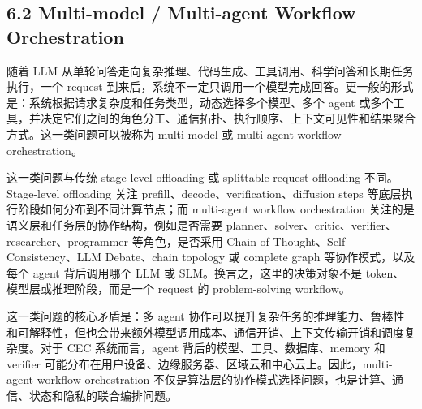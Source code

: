 \documentclass[a4paper,twocolumn,10pt]{ctexart}
\begin{document}
\subsection{6.2 Multi-model / Multi-agent Workflow Orchestration}

随着 LLM 从单轮问答走向复杂推理、代码生成、工具调用、科学问答和长期任务执行，一个 request 到来后，系统不一定只调用一个模型完成回答。更一般的形式是：系统根据请求复杂度和任务类型，动态选择多个模型、多个 agent 或多个工具，并决定它们之间的角色分工、通信拓扑、执行顺序、上下文可见性和结果聚合方式。这一类问题可以被称为 multi-model 或 multi-agent workflow orchestration。


这一类问题与传统 stage-level offloading 或 splittable-request offloading 不同。Stage-level offloading 关注 prefill、decode、verification、diffusion steps 等底层执行阶段如何分布到不同计算节点；而 multi-agent workflow orchestration 关注的是语义层和任务层的协作结构，例如是否需要 planner、solver、critic、verifier、researcher、programmer 等角色，是否采用 Chain-of-Thought、Self-Consistency、LLM Debate、chain topology 或 complete graph 等协作模式，以及每个 agent 背后调用哪个 LLM 或 SLM。换言之，这里的决策对象不是 token、模型层或推理阶段，而是一个 request 的 problem-solving workflow。


这一类问题的核心矛盾是：多 agent 协作可以提升复杂任务的推理能力、鲁棒性和可解释性，但也会带来额外模型调用成本、通信开销、上下文传输开销和调度复杂度。对于 CEC 系统而言，agent 背后的模型、工具、数据库、memory 和 verifier 可能分布在用户设备、边缘服务器、区域云和中心云上。因此，multi-agent workflow orchestration 不仅是算法层的协作模式选择问题，也是计算、通信、状态和隐私的联合编排问题。
\end{document}
